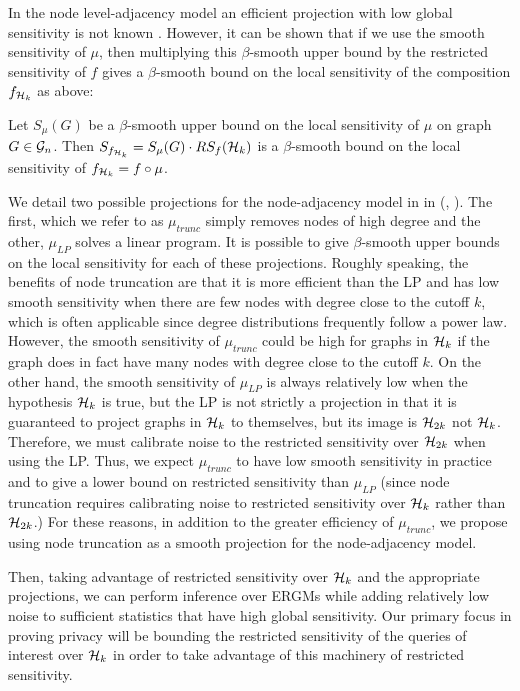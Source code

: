 In the node level-adjacency model an efficient projection with low global sensitivity is not known \cite{KNRS13}. However, it can be shown that if we use the smooth sensitivity of $\mu$, then multiplying this $\beta$-smooth upper bound by the restricted sensitivity of $f$ gives a $\beta$-smooth bound on the local sensitivity of the composition $f_{\mathcal{H}_{k}}$ as above:

\begin{lemma}
	\label{lemma:restricted_sensitivity_global}
	Let $S_\mu(G)$ be a $\beta$-smooth upper bound on the local sensitivity of $\mu$ on graph $G \in \mathcal{G}_n$. Then $S_{f_{\mathcal{H}_k}} = S_\mu(G) \cdot RS_f(\mathcal{H}_k)$ is a $\beta$-smooth bound on the local sensitivity of $f_{\mathcal{H}_{k}} = f \circ \mu$.
\end{lemma}

We detail two possible projections for the node-adjacency model in in  (\cite{KNRS13}, \cite{BBDS13}). The first, which we refer to as $\mu_{trunc}$ simply removes nodes of high degree and the other, $\mu_{LP}$ solves a linear program. It is possible to give $\beta$-smooth upper bounds on the local sensitivity for each of these projections. Roughly speaking, the benefits of node truncation are that it is more efficient than the LP and has low smooth sensitivity when there are few nodes with degree close to the cutoff $k$, which is often applicable since degree distributions frequently follow a power law. However, the smooth sensitivity of $\mu_{trunc}$ could be high for graphs in $\mathcal{H}_k$ if the graph does in fact have many nodes with degree close to the cutoff $k$. On the other hand, the smooth sensitivity of $\mu_{LP}$ is always relatively low when the hypothesis $\mathcal{H}_k$ is true, but the LP is not strictly a projection in that it is guaranteed to project graphs in $\mathcal{H}_k$ to themselves, but its image is $\mathcal{H}_{2k}$ not $\mathcal{H}_k$. Therefore, we must calibrate noise to the restricted sensitivity over $\mathcal{H}_{2k}$ when using the LP. Thus, we expect $\mu_{trunc}$ to have low smooth sensitivity in practice and to give a lower bound on restricted sensitivity than $\mu_{LP}$ (since node truncation requires calibrating noise to restricted sensitivity over $\mathcal{H}_k$ rather than $\mathcal{H}_{2k}$.) For these reasons, in addition to the greater efficiency of $\mu_{trunc}$, we propose using node truncation as a smooth projection for the node-adjacency model. 

 Then, taking advantage of restricted sensitivity over $\mathcal{H}_k$ and the appropriate projections, we can perform inference over ERGMs while adding relatively low noise to sufficient statistics that have high global sensitivity.  Our primary focus in proving privacy will be bounding the restricted sensitivity of the queries of interest over $\mathcal{H}_k$ in order to take advantage of this machinery of restricted sensitivity.